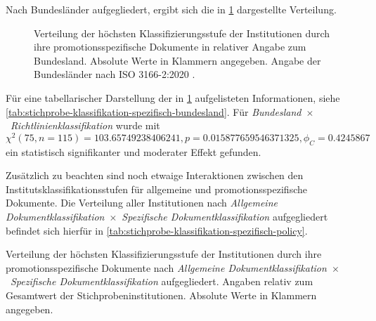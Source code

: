 Nach Bundesländer aufgegliedert, ergibt sich die in \cref{fig:policy-klassifikation-spezifisch-absolut} dargestellte Verteilung.
\begin{figure}[!htbp]
    \centering
    \resizebox{\textwidth}{!}{}
    \caption{Verteilung der höchsten Klassifizierungsstufe der Institutionen durch ihre promotionsspezifische Dokumente in relativer Angabe zum Bundesland.
    Absolute Werte in Klammern angegeben.
    Angabe der Bundesländer nach ISO 3166-2:2020 \autocite{ISO3166}.}
    \label{fig:policy-klassifikation-spezifisch-absolut}
\end{figure}
Für eine tabellarischer Darstellung der in \cref{fig:policy-klassifikation-spezifisch-absolut} aufgelisteten Informationen, siehe \cref{tab:stichprobe-klassifikation-spezifisch-bundesland}.
Für \textit{Bundesland}~$\times$~\textit{Richtlinienklassifikation} wurde mit $\chi^2 (\num{75}, n=\num{115}) = \num[round-mode=places,round-precision=2]{103,65749238406241}, p = \num[round-mode=places,round-precision=2]{0,015877659546371325},\phi_C=\num[round-mode=places,round-precision=2]{0.4245867}$ ein statistisch signifikanter und moderater Effekt gefunden.

Zusätzlich zu beachten sind noch etwaige Interaktionen zwischen den Institutsklassifikationsstufen für allgemeine und promotionsspezifische Dokumente.
Die Verteilung aller Institutionen nach \textit{Allgemeine Dokumentklassifikation}~$\times$~\textit{Spezifische Dokumentklassifikation} aufgegliedert befindet sich hierfür in \cref{tab:stichprobe-klassifikation-spezifisch-policy}.
\begin{table}[!htbp]
	\caption{Verteilung der höchsten Klassifizierungsstufe der Institutionen durch ihre promotionsspezifische Dokumente nach \textit{Allgemeine Dokumentklassifikation}~$\times$~\textit{Spezifische Dokumentklassifikation} aufgegliedert.
    Angaben relativ zum Gesamtwert der Stichprobeninstitutionen.
    Absolute Werte in Klammern angegeben.}
    
	\label{tab:stichprobe-klassifikation-spezifisch-policy}
\end{table}
\pagebreak

